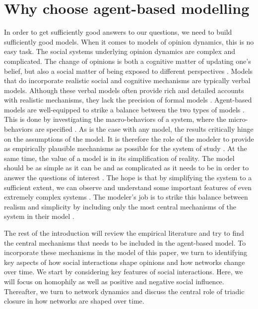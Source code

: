 \documentclass{article}
\begin{document}
\section{Why choose agent-based modelling}
In order to get sufficiently good answers to our questions, we need to build sufficiently good models. When it comes to models of opinion dynamics, this is no easy task. The social systems underlying opinion dynamics are complex and complicated. The change of opinions is both a cognitive matter of updating one’s belief, but also a social matter of being exposed to different perspectives \cite{flache_models_2017,friedkin_social_1990,spears_social_2021}. Models that do incorporate realistic social and cognitive mechanisms are typically verbal models. Although these verbal models often provide rich and detailed accounts with realistic mechanisms, they lack the precision of formal models \cite{fogarty_ten_2022,galesic_integrating_2021,smaldino_how_2020}. Agent-based models are well-equipped to strike a balance between the two types of models \cite{flache_between_2018,galesic_integrating_2021,epstein1999agent,mas2014cultural} . This is done by investigating the macro-behaviors of a system, where the micro-behaviors are specified \cite{bruch_agent-based_2015,epstein1999agent,flache_between_2018}. As is the case with any model, the results critically hinge on the assumptions of the model. It is therefore the role of the modeler to provide as empirically plausible mechanisms as possible for the system of study \cite{crooks2012introduction,epstein1999agent,page2010diversity}. At the same time, the value of a model is in its simplification of reality. The model should be as simple as it can be and as complicated as it needs to be in order to answer the questions of interest \cite{smaldino_how_2020}. The hope is that by simplifying the system to a sufficient extent, we can observe and understand some important features of even extremely complex systems \cite{fogarty_ten_2022,smaldino_how_2020}. The modeler’s job is to strike this balance between realism and simplicity by including only the most central mechanisms of the system in their model \cite{smaldino_models_2016}. 

The rest of the introduction will review the empirical literature and try to find the central mechanisms that needs to be included in the agent-based model. To incorporate these mechanisms in the model of this paper, we turn to identifying key aspects of how social interactions shape opinions and how networks change over time. We start by considering key features of social interactions. Here, we will focus on homophily as well as positive and negative social influence. Thereafter, we turn to network dynamics and discuss the central role of triadic closure in how networks are shaped over time.
\end{document}
